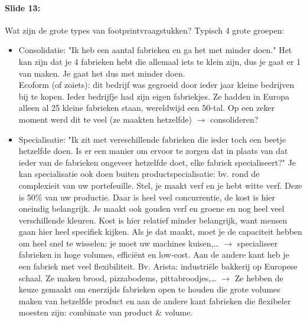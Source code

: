 \documentclass[10pt,a4paper]{report}
\begin{document}
\paragraph{Slide 13:} Wat zijn de grote types van footprintvraagstukken? Typisch 4 grote groepen:
\begin{itemize}
\item Consolidatie: "Ik heb een aantal fabrieken en ga het met minder doen." Het kan zijn dat je 4 fabrieken hebt die allemaal iets te klein zijn, dus je gaat er 1 van maken. Je gaat het dus met minder doen.\\
Ecoform (of zoiets): dit bedrijf was gegroeid door ieder jaar kleine bedrijven bij te kopen. Ieder bedrijfje had zijn eigen fabriekjes. Ze hadden in Europa alleen al 25 kleine fabrieken staan, wereldwijd een 50-tal. Op een zeker moment werd dit te veel (ze maakten hetzelfde) $\rightarrow$ consolideren? 
\item Specialisatie: "Ik zit met vereschillende fabrieken die ieder toch een beetje hetzelfde doen. Is er een manier om ervoor te zorgen dat in plaats van dat ieder van de fabrieken ongeveer hetzelfde doet, elke fabriek specialiseert?" Je kan specialisatie ook doen buiten productspecialisatie: bv. rond de complexieit van uw portefeuille. Stel, je maakt verf en je hebt witte verf. Deze is 50\% van uw productie. Daar is heel veel concurrentie, de kost is hier oneindig belangrijk. Je maakt ook gouden verf en groene en nog heel veel verschillende kleuren. Kost is hier relatief minder belangrijk, want mensen gaan hier heel specifiek kijken. Als je dat maakt, moet je de capaciteit hebben om heel snel te wisselen: je moet uw machines kuisen,… $\rightarrow$ specialiseer fabrieken in hoge volumes, effici\"ent en low-cost. Aan de andere kant heb je een fabriek met veel flexibiliteit. Bv. Arista: industri\"ele bakkerij op Europese schaal. Ze maken brood, pizzabodems, pittabroodjes,… $\rightarrow$ Ze hebben de keuze gemaakt om enerzijds fabrieken open te houden die grote volumes maken van hetzelfde product en aan de andere kant fabrieken die flexibeler moesten zijn: combinate van product $\&$ volume.

\end{itemize}
\end{document}
